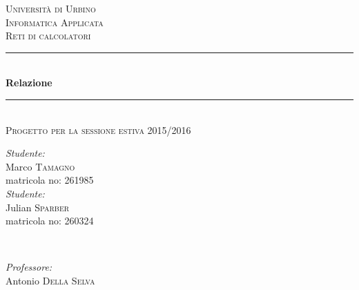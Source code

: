 \documentclass[11pt, a4paper, titlepage, block]{article}
\begin{document}
	\begin{titlepage}

		\newcommand{\HRule}{\rule{\linewidth}{0.5mm}} %

		\center %


		\textsc{\LARGE Universit\`a di Urbino}\\[1.5cm] %
		\textsc{\Large Informatica Applicata}\\[0.5cm] %
		\textsc{\large Reti di calcolatori}\\[0.5cm] %



		\HRule \\[0.4cm]
		{ \huge \bfseries Relazione}\\[0.2cm] %
		\HRule \\[0.4cm]
		\textsc{\large Progetto per la sessione estiva 2015/2016}
		\\[2cm]

		\begin{minipage}{\textwidth}
			\begin{flushleft}
				\emph{Studente:}\\
				Marco \textsc{Tamagno}\\ %
				matricola no: 261985
				\\[1cm]
				\emph{Studente:}\\
				Julian \textsc{Sparber}\\ %
				matricola no: 260324\\
			\end{flushleft}
		\end{minipage}\\[3cm]

		\begin{minipage}{\textwidth}
			\begin{flushright}
				\emph{Professore:} \\
				 Antonio \textsc{Della Selva}\\ %
			\end{flushright}
		\end{minipage}\\[4cm]


\end{titlepage}
\end{document}
